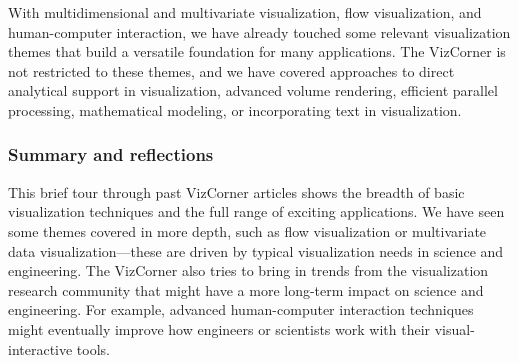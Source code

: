 \documentclass[10pt,journal,compsoc]{IEEEtran}
\begin{document}
With multidimensional and multivariate visualization, flow visualization, and human-computer interaction, we have already touched some relevant visualization themes that build a versatile foundation for many applications. The VizCorner is not restricted to these themes, and we have covered approaches to direct analytical support in visualization, advanced volume rendering, efficient parallel processing, mathematical modeling, or incorporating text in visualization.  %





\subsubsection{Summary and reflections}

This brief tour through past VizCorner articles shows the breadth of basic visualization techniques and the full range of exciting applications. We have seen some themes covered in more depth, such as flow visualization or multivariate data visualization---these are driven by typical visualization needs in science and engineering. The VizCorner also tries to bring in trends from the visualization research community that might have a more long-term impact on science and engineering. For example, advanced human-computer interaction techniques might eventually improve how engineers or scientists work with their visual-interactive tools. 
\end{document}
